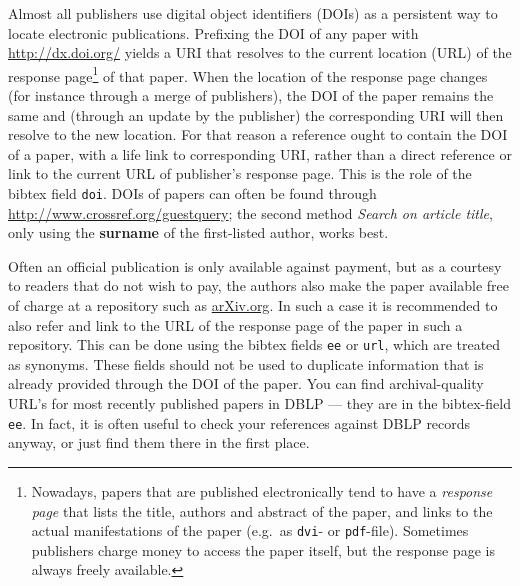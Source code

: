 \documentclass[]{tukseminar}
\begin{document}
Almost all publishers use digital object identifiers (DOIs) as a persistent way to locate electronic publications.
Prefixing the DOI of any paper with \url{http://dx.doi.org/} yields a URI that resolves to the current location (URL) of the response page\footnote{Nowadays, papers that are published electronically tend to have a \emph{response page} that lists the title, authors and abstract of the paper, and links to the actual manifestations of the paper (e.g.\ as \texttt{dvi}- or \texttt{pdf}-file).
Sometimes publishers charge money to access the paper itself, but the response page is always freely available.} of that paper.
When the location of the response page changes (for instance through a merge of publishers), the DOI of the paper remains the same and (through an update by the publisher) the corresponding URI will then resolve to the new location.
For that reason a reference ought to contain the DOI of a paper, with a life link to corresponding URI, rather than a direct reference or link to the current URL of publisher's response page.
This is the role of the bibtex field \texttt{doi}.
DOIs of papers can often be found through \url{http://www.crossref.org/guestquery}; the second method {\itshape Search on article title}, only using the {\bfseries surname} of the first-listed author, works best.

Often an official publication is only available against payment, but as a courtesy to readers that do not wish to pay, the authors also make the paper available free of charge at a repository such as \url{arXiv.org}.
In such a case it is recommended to also refer and link to the URL of the response page of the paper in such a repository.
This can be done using the bibtex fields \texttt{ee} or \texttt{url}, which are treated as synonyms.
These fields should not be used to duplicate information that is already provided through the DOI of the paper.
You can find archival-quality URL's for most recently published papers in DBLP --- they are in the bibtex-field \texttt{ee}.
In fact, it is often useful to check your references against DBLP records anyway, or just find them there in the first place.

\newpage
\nocite{*}



\end{document}
